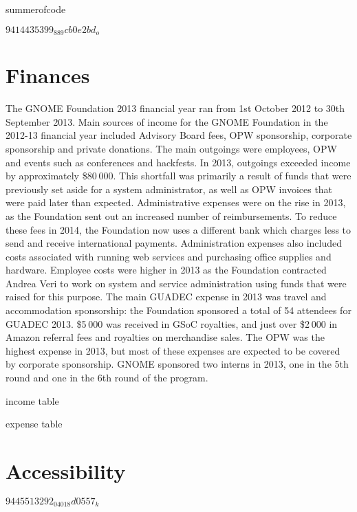 \documentclass{scrreprt}
\begin{document}
summerofcode


$9414435399_889cb0e2bd_o$


\section{Finances}

The GNOME Foundation 2013 financial year ran from 1st October 2012 to 30th September 2013. Main sources of income for the GNOME Foundation in the 2012-13 financial year included Advisory Board fees, OPW sponsorship, corporate sponsorship and private donations. The main outgoings were employees, OPW and events such as conferences and hackfests. In 2013, outgoings exceeded income by approximately \$80 000. This shortfall was primarily a result of funds that were previously set aside for a system administrator, as well as OPW invoices that were paid later than expected.
Administrative expenses were on the rise in 2013, as the Foundation sent out an increased number of reimbursements. To reduce these fees in 2014, the Foundation now uses a different bank which charges less to send and receive international payments. Administration expenses also included costs associated with running web services and purchasing office supplies and hardware. Employee costs were higher in 2013 as the Foundation contracted Andrea Veri to work on system and service administration using funds that were raised for this purpose.
The main GUADEC expense in 2013 was travel and accommodation sponsorship: the Foundation sponsored a total of 54 attendees for GUADEC 2013. \$5 000 was received in GSoC royalties, and just over \$2 000 in Amazon referral fees and royalties on merchandise sales. The OPW was the highest expense in 2013, but most of these expenses are expected to be covered by corporate sponsorship. GNOME sponsored two interns in 2013, one in the 5th round and one in the 6th round of the program.

income table

expense table



\section{Accessibility}

$9445513292_04018d0557_k$
\end{document}
